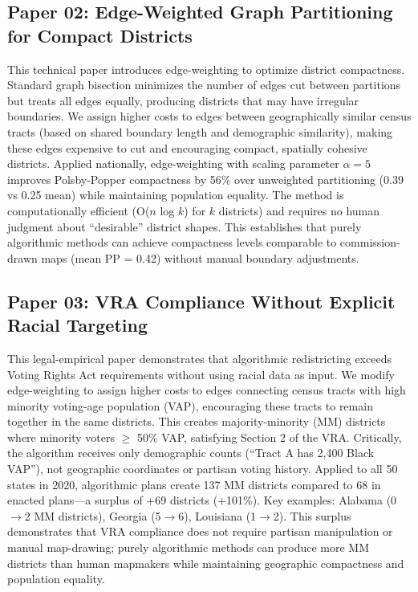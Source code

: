 \documentclass[11pt]{article}
\begin{document}
\subsection*{Paper 02: Edge-Weighted Graph Partitioning for Compact Districts}

This technical paper introduces edge-weighting to optimize district compactness. Standard graph bisection minimizes the number of edges cut between partitions but treats all edges equally, producing districts that may have irregular boundaries. We assign higher costs to edges between geographically similar census tracts (based on shared boundary length and demographic similarity), making these edges expensive to cut and encouraging compact, spatially cohesive districts. Applied nationally, edge-weighting with scaling parameter $\alpha=5$ improves Polsby-Popper compactness by 56\% over unweighted partitioning (0.39 vs 0.25 mean) while maintaining population equality. The method is computationally efficient (O($n$ log $k$) for $k$ districts) and requires no human judgment about ``desirable'' district shapes. This establishes that purely algorithmic methods can achieve compactness levels comparable to commission-drawn maps (mean PP = 0.42) without manual boundary adjustments.

\subsection*{Paper 03: VRA Compliance Without Explicit Racial Targeting}

This legal-empirical paper demonstrates that algorithmic redistricting exceeds Voting Rights Act requirements without using racial data as input. We modify edge-weighting to assign higher costs to edges connecting census tracts with high minority voting-age population (VAP), encouraging these tracts to remain together in the same districts. This creates majority-minority (MM) districts where minority voters $\geq$ 50\% VAP, satisfying Section 2 of the VRA. Critically, the algorithm receives only demographic counts (``Tract A has 2,400 Black VAP''), not geographic coordinates or partisan voting history. Applied to all 50 states in 2020, algorithmic plans create 137 MM districts compared to 68 in enacted plans---a surplus of +69 districts (+101\%). Key examples: Alabama (0$\rightarrow$2 MM districts), Georgia (5$\rightarrow$6), Louisiana (1$\rightarrow$2). This surplus demonstrates that VRA compliance does not require partisan manipulation or manual map-drawing; purely algorithmic methods can produce more MM districts than human mapmakers while maintaining geographic compactness and population equality.
\end{document}
